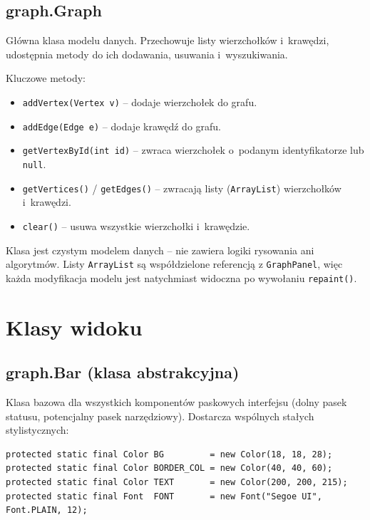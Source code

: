 \documentclass[12pt]{article}
\begin{document}

\subsection{graph.Graph}

Główna klasa modelu danych. Przechowuje listy wierzchołków i~krawędzi,
udostępnia metody do ich dodawania, usuwania i~wyszukiwania.

Kluczowe metody:
\begin{itemize}
    \item \texttt{addVertex(Vertex v)} -- dodaje wierzchołek do grafu.
    \item \texttt{addEdge(Edge e)} -- dodaje krawędź do grafu.
    \item \texttt{getVertexById(int id)} -- zwraca wierzchołek o~podanym
          identyfikatorze lub \texttt{null}.
    \item \texttt{getVertices()} / \texttt{getEdges()} -- zwracają listy
          (\texttt{ArrayList}) wierzchołków i~krawędzi.
    \item \texttt{clear()} -- usuwa wszystkie wierzchołki i~krawędzie.
\end{itemize}

Klasa jest czystym modelem danych -- nie zawiera logiki rysowania ani
algorytmów. Listy \texttt{ArrayList} są współdzielone referencją z
\texttt{GraphPanel}, więc każda modyfikacja modelu jest natychmiast widoczna
po wywołaniu \texttt{repaint()}.

\section{Klasy widoku}

\subsection{graph.Bar (klasa abstrakcyjna)}

Klasa bazowa dla wszystkich komponentów paskowych interfejsu (dolny pasek
statusu, potencjalny pasek narzędziowy). Dostarcza wspólnych stałych
stylistycznych:

\begin{lstlisting}
protected static final Color BG         = new Color(18, 18, 28);
protected static final Color BORDER_COL = new Color(40, 40, 60);
protected static final Color TEXT       = new Color(200, 200, 215);
protected static final Font  FONT       = new Font("Segoe UI", Font.PLAIN, 12);
\end{lstlisting}
\end{document}
